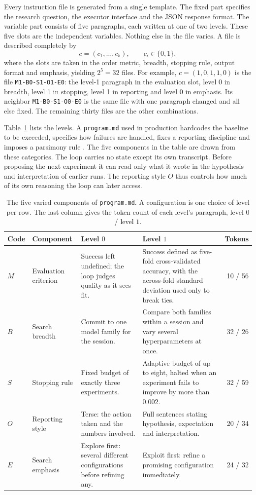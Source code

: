 \documentclass[11pt]{article}
\begin{document}
Every instruction file is generated from a single template. The fixed part specifies the research question, the executor interface and the JSON response format. The variable part consists of five paragraphs, each written at one of two levels. These five slots are the independent variables. Nothing else in the file varies. A file is described completely by
\[
c = (c_1,\ldots,c_5), \qquad c_i \in \{0,1\},
\]
where the slots are taken in the order metric, breadth, stopping rule, output format and emphasis, yielding $2^5 = 32$ files. For example, $c = (1,0,1,1,0)$ is the file \texttt{M1-B0-S1-O1-E0}: the level-1 paragraph in the evaluation slot, level 0 in breadth, level 1 in stopping, level 1 in reporting and level 0 in emphasis. Its neighbor \texttt{M1-B0-S1-O0-E0} is the same file with one paragraph changed and all else fixed. The remaining thirty files are the other combinations.

Table~\ref{tab:axes} lists the levels. A \texttt{program.md} used in production hardcodes the baseline to be exceeded, specifies how failures are handled, fixes a reporting discipline and imposes a parsimony rule \cite{Tuychiev2026guide}. The five components in the table are drawn from these categories. The loop carries no state except its own transcript. Before proposing the next experiment it can read only what it wrote in the hypothesis and interpretation of earlier runs. The reporting style $O$ thus controls how much of its own reasoning the loop can later access.

\begin{table}[t]
\centering
\small
\setlength{\tabcolsep}{4pt}
\caption{The five varied components of \texttt{program.md}. A configuration is one choice of level per row. The last column gives the token count of each level's paragraph, level $0$ / level $1$.}
\label{tab:axes}
\begin{tabular}{@{}p{0.8cm}p{2.0cm}p{4.3cm}p{4.3cm}r@{}}
\toprule
Code & Component & Level $0$ & Level $1$ & Tokens \\
\midrule
$M$ & Evaluation criterion & Success left undefined; the loop judges quality as it sees fit. & Success defined as five-fold cross-validated accuracy, with the across-fold standard deviation used only to break ties. & 10 / 56 \\
$B$ & Search breadth & Commit to one model family for the session. & Compare both families within a session and vary several hyperparameters at once. & 32 / 26 \\
$S$ & Stopping rule & Fixed budget of exactly three experiments. & Adaptive budget of up to eight, halted when an experiment fails to improve by more than $0.002$. & 32 / 59 \\
$O$ & Reporting style & Terse: the action taken and the numbers involved. & Full sentences stating hypothesis, expectation and interpretation. & 20 / 34 \\
$E$ & Search emphasis & Explore first: several different configurations before refining any. & Exploit first: refine a promising configuration immediately. & 24 / 32 \\
\bottomrule
\end{tabular}
\end{table}
\end{document}

